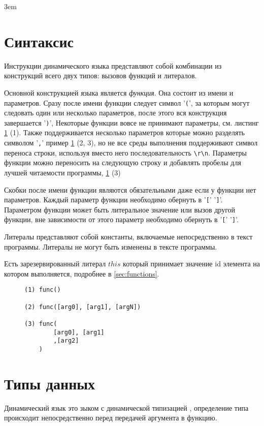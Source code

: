 \documentclass[../index.tex]{subfiles}
\begin{document}
\emergencystretch 3em
\section{Синтаксис}

Инструкции динамического языка представляют собой комбинации из конструкций всего двух типов: вызовов функций и литералов.

Основной конструкцией языка является \textit{функция}. Она состоит из имени и параметров. 
Сразу после имени функции следует символ '\verb|(|', за которым могут следовать один или 
несколько параметров, после этого вся конструкция завершается '\verb|)|', 
Некоторые функции вовсе не принимают параметры, см. листинг \ref{lst:lecsic} (1). 
Также поддерживается несколько параметров которые можно разделять символом '\verb|,|'
пример \ref{lst:lecsic} (2, 3), но не все среды выполнения 
поддерживают символ переноса строки, используя вместо него последовательность \verb|\r\n|.
Параметры функции можно переносить на следующую строку и добавлять пробелы для 
лучшей читаемости программы, \ref{lst:lecsic} (3)

Скобки после имени функции являются обязательными даже если у функции нет параметров.
Каждый параметр функции необходимо обернуть в '\verb|[|' '\verb|]|'.
Параметром функции может быть литеральное значение или вызов другой функции, вне зависимости от этого 
параметр необходимо обернуть в '\verb|[|' '\verb|]|'.

Литералы представляют собой константы, включаемые непосредственно в текст программы. 
Литералы не могут быть изменены в тексте программы.

Есть зарезервированный литерал $this$ который принимает значение id элемента на котором выполняется, 
подробнее в \autoref{sec:functions}.

\begin{figure}\label{lst:lecsic}
\begin{verbatim}
(1) func()

(2) func([arg0], [arg1], [argN])

(3) func(
        [arg0], [arg1]
        ,[arg2]
    )
\end{verbatim}        
\end{figure}

\section{Типы данных}\label{sec:types}

Динамический язык это зыком с динамической типизацией \footnotemark, определение типа происходит 
непосредственно перед передачей аргумента в функцию. 
\end{document}
